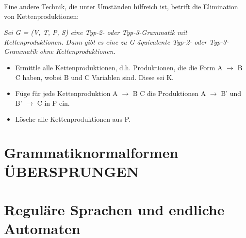 \documentclass[11pt, a4paper]{article}
\begin{document}
\begin{flushleft}
    \vspace{1cm}

    Eine andere Technik, die unter Umständen hilfreich ist, betrift die Elimination von Kettenproduktionen:

    \begin{tcolorbox}[title = Satz 1.2]
        \begin{flushleft}
            \textit{Sei G = (V, T, P, S) eine Typ-2- oder Typ-3-Grammatik mit Kettenproduktionen. Dann gibt es eine zu G äquivalente Typ-2- oder Typ-3-Grammatik ohne Kettenproduktionen.}
        \end{flushleft}
    \end{tcolorbox}

    \begin{tcolorbox}[title = Satz 1.2 Beweis, colbacktitle = white, coltitle = black, colframe = black, colback = white, fonttitle = \bfseries]
        \begin{flushleft}
            \begin{itemize}[-]
                \item Ermittle alle Kettenproduktionen, d.h. Produktionen, die die Form A \(\rightarrow\) B C haben, wobei B und C Variablen sind. Diese sei K.
                \item Füge für jede Kettenproduktion A \(\rightarrow\) B C die Produktionen A \(\rightarrow\) B' und B' \(\rightarrow\) C in P ein.
                \item Lösche alle Kettenproduktionen aus P.
            \end{itemize}
        \end{flushleft}
    \end{tcolorbox}

\end{flushleft}

\section{Grammatiknormalformen ÜBERSPRUNGEN}

\newpage

\section{Reguläre Sprachen und endliche Automaten}
\end{document}
